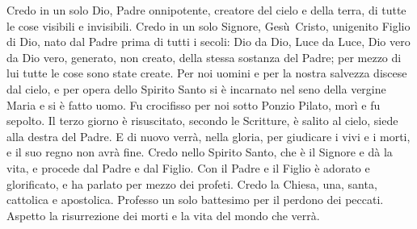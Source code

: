 Credo in un solo Dio, Padre onnipotente, creatore del cielo e della terra, di tutte le cose visibili e invisibili.
Credo in un solo Signore, Gesù~Cristo, unigenito Figlio di Dio, nato dal Padre prima di tutti i secoli:
Dio da Dio, Luce da Luce, Dio vero da Dio vero, generato, non creato, della stessa sostanza del Padre;
per mezzo di lui tutte le cose sono state create.
Per noi uomini e per la nostra salvezza discese dal cielo, e per opera dello Spirito Santo si è incarnato nel seno della vergine Maria e si è fatto uomo.
Fu crocifisso per noi sotto Ponzio Pilato, morì e fu sepolto.
Il terzo giorno è risuscitato, secondo le Scritture, è salito al cielo, siede alla destra del Padre.
E di nuovo verrà, nella gloria, per giudicare i vivi e i morti, e il suo regno non avrà fine.
Credo nello Spirito Santo, che è il Signore e dà la vita, e procede dal Padre e dal Figlio.
Con il Padre e il Figlio è adorato e glorificato, e ha parlato per mezzo dei profeti.
Credo la Chiesa, una, santa, cattolica e apostolica.
Professo un solo battesimo per il perdono dei peccati.
Aspetto la risurrezione dei morti e la vita del mondo che verrà.
\amen
